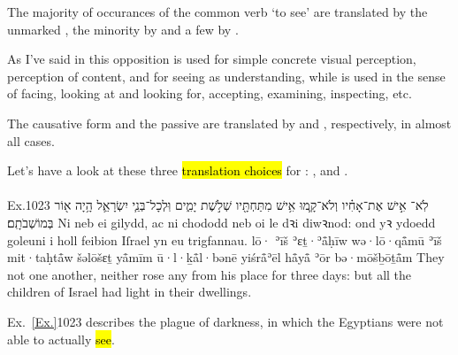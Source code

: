 
\begin{paper}
	{\click} The majority of occurances of the common verb  ‘to see’ are translated by the unmarked , the minority by  and a few by .

	As I’ve said  in this opposition is used for simple concrete visual perception, perception of content, and for seeing as understanding, while  is used in the sense of facing, looking at and looking for, accepting, examining, inspecting, etc.

	The causative form  and the passive  are translated by  and , respectively, in almost all cases.

	Let’s have a look at these three \hl{translation choices} for : ,  and .
\end{paper}



\paragraph{}

\label{sight:rå̄ʾå̄:gweled:sensory}

\begin{example}{Ex.}{10}{23}{}{}
	\quoling
	{לֹֽא־ אִ֣ישׁ אֶת־אָחִ֗יו וְלֹא־קָ֛מוּ אִ֥ישׁ מִתַּחְתָּ֖יו שְׁלֹ֣שֶׁת יָמִ֑ים וּֽלְכָל־בְּנֵ֧י יִשְׂרָאֵ֛ל הָ֥יָה א֖וֹר בְּמוֹשְׁבֹתָֽם׃}
	{Ni  neb ei gilydd, ac ni chododd neb oi le dꝛi diwꝛnod: ond yꝛ ydoedd goleuni i holl feibion Iſrael yn eu trigfannau.}
	{lō· ʾīš ʾɛṯ·ʾå̄ḥīw wə·lō·qå̄mū ʾīš mit·taḥtå̄w šəlōšɛṯ yå̄mīm ū·l·ḵå̄l·bənē yiśrå̄ʾēl hå̄yå̄ ʾōr bə·mōšḇōṯå̄m}
	{They  not one another, neither rose any from his place for three days: but all the children of Israel had light in their dwellings.}
\end{example}
\begin{paper}
	\explain Ex.~\vref{Ex.}{10}{23}{} describes the plague of darkness, in which the Egyptians were not able to actually \hl{see}.
\end{paper}

